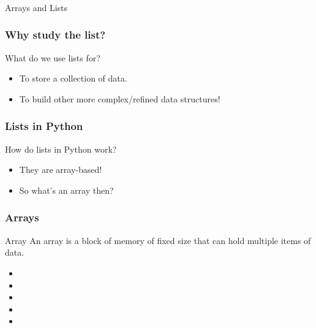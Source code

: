 \begin{frame}[fragile]\frametitle{}
\begin{center}
{\Large Arrays and Lists}
\end{center}

\end{frame}

\begin{frame}
	\frametitle{Why study the list?}
		What do we use lists for?	

		\begin{itemize}
			\item To store a collection of data.
			\item To build other more complex/refined data structures!
		\end{itemize}
\end{frame}

\begin{frame}
	\frametitle{Lists in Python}
		How do lists in Python work?

		\begin{itemize}
			\item 		They are array-based!
			\item   	So what's an array then?
	\end{itemize}
\end{frame}

\begin{frame}
	\frametitle{Arrays}
	\begin{block}{Array}
		An array is a block of memory of fixed size that can hold multiple items of data.
	\end{block}	


	

			\begin{itemize}
			\item 	
			\item
			\item 	
			\item
			\item 	
	\end{itemize}


\end{frame}

